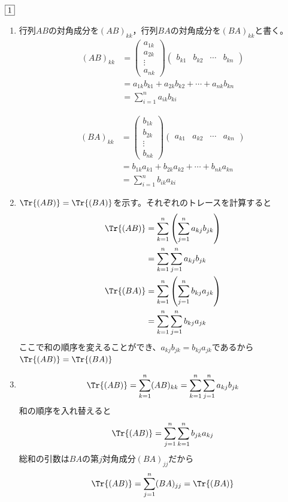 \documentclass[dvipdfmx]{jsreport}
\begin{document}
\begin{souanswer} %
	$\fbox{1}$ 
\begin{enumerate}
	\item 行列$AB$の対角成分を$(AB)_{kk}$，行列$BA$の対角成分を$(BA)_{kk}$と書く。
\begin{align*}
	(AB)_{kk}
&= \begin{pmatrix}a_{1k}\\ a_{2k}\\ \vdots\\ a_{nk}\end{pmatrix}\begin{pmatrix}b_{k1}& b_{k2}& \cdots& b_{kn}\end{pmatrix}\\
&= a_{1k}b_{k1}+ a_{2k}b_{k2}+ \cdots+ a_{nk}b_{kn}\\
&= \sum_{i= 1}^n a_{ik}b_{ki}
\end{align*}

\begin{align*}
	(BA)_{kk}
&= \begin{pmatrix}b_{1k}\\ b_{2k}\\ \vdots\\ b_{nk}\end{pmatrix}\begin{pmatrix}a_{k1}& a_{k2}& \cdots& a_{kn}\end{pmatrix}\\
&= b_{1k}a_{k1}+ b_{2k}a_{k2}+ \cdots+ b_{nk}a_{kn}\\
&= \sum_{i= 1}^n b_{ik}a_{ki}
\end{align*}

	\item $\Tr{(AB)}= \Tr{(BA)}$を示す。それぞれのトレースを計算すると
\begin{align*}
	\Tr{(AB)}
&= \sum_{k= 1}^n \left(\sum_{j= 1}^ n a_{kj}b_{jk}\right)\\
&= \sum_{k= 1}^n \sum_{j= 1}^ n a_{kj}b_{jk}\\
	\Tr{(BA)}
&= \sum_{k= 1}^n \left(\sum_{j= 1}^ n b_{kj}a_{jk}\right)\\
&= \sum_{k= 1}^n \sum_{j= 1}^n b_{kj}a_{jk}
\end{align*}
	ここで和の順序を変えることができ、$a_{kj}b_{jk}= b_{kj}a_{jk}$であるから$\Tr{(AB)}= \Tr{(BA)}$

	\item 
\begin{equation*}
	\Tr{(AB)}= \sum_{k= 1}^n(AB)_{kk}= \sum_{k= 1}^n \sum_{j= 1}^n a_{kj}b_{jk}
\end{equation*}
	和の順序を入れ替えると
\begin{equation*}
	\Tr{(AB)}= \sum_{j= 1}^n\sum_{k= 1}^n b_{jk}a_{kj}
\end{equation*}
	総和の引数は$BA$の第$j$対角成分$(BA)_{jj}$だから
\begin{equation*}
	\Tr{(AB)}= \sum_{j= 1}^n(BA)_{jj}= \Tr{(BA)}
\end{equation*}


\end{enumerate}
\end{souanswer}
\end{document}
